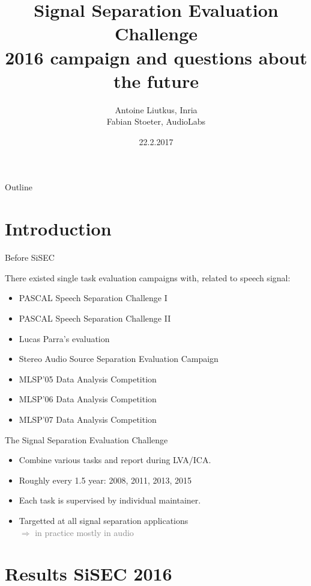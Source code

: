 \documentclass{beamer}
\title[SISEC 2.0]{Signal Separation Evaluation Challenge\\2016 campaign and questions about the future}
\author{Antoine Liutkus, Inria\\ Fabian Stoeter, AudioLabs}
\date{22.2.2017}
\begin{document}
\begin{frame}
  \titlepage
\end{frame}

\begin{frame}{Outline}
 \tableofcontents
\end{frame}

\section{Introduction}

\begin{frame}{Before SiSEC}

There existed single task evaluation campaigns with, related to speech
signal:

\begin{itemize}

\item
  PASCAL Speech Separation Challenge I
\item
  PASCAL Speech Separation Challenge II
\item
  Lucas Parra's evaluation
\item
  Stereo Audio Source Separation Evaluation Campaign
\item
  MLSP'05 Data Analysis Competition
\item
  MLSP'06 Data Analysis Competition
\item
  MLSP'07 Data Analysis Competition
\end{itemize}

\end{frame}

\begin{frame}{The Signal Separation Evaluation Challenge}


\begin{itemize}
\item Combine various tasks and report during LVA/ICA. 
\item Roughly every 1.5 year: 2008, 2011, 2013, 2015
\item Each task is supervised by individual maintainer.
\item Targetted at all signal separation applications\\\textcolor{gray}{$\Rightarrow$ in practice mostly in audio}
\end{itemize}

\end{frame}

\section{Results SiSEC 2016}
\end{document}
